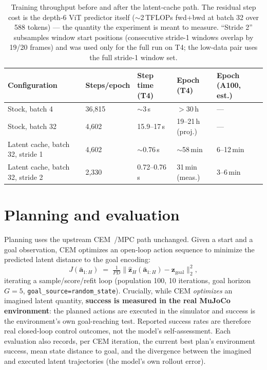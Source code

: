 \documentclass[11pt,a4paper]{article}
\newcommand{\zlat}{\mathbf{z}}
\newcommand{\abar}{\bar{\mathbf{a}}}
\begin{document}
\begin{table}[h]
\centering
\small
\begin{tabular}{lllll}
\toprule
Configuration & Steps/epoch & Step time (T4) & Epoch (T4) & Epoch (A100, est.) \\
\midrule
Stock, batch 4              & 36{,}815 & $\sim$3\,s    & $>$30\,h          & --- \\
Stock, batch 32             & 4{,}602  & 15.9--17\,s   & 19--21\,h (proj.) & --- \\
Latent cache, batch 32, stride 1 & 4{,}602 & $\sim$0.76\,s & $\sim$58\,min & 6--12\,min \\
Latent cache, batch 32, stride 2 & 2{,}330 & 0.72--0.76\,s & 31\,min (meas.) & 3--6\,min \\
\bottomrule
\end{tabular}
\caption{Training throughput before and after the latent-cache path. The
residual step cost is the depth-6 ViT predictor itself ($\sim$2\,TFLOPs
fwd+bwd at batch 32 over 588 tokens) --- the quantity the experiment is meant
to measure. ``Stride 2'' subsamples window start positions (consecutive
stride-1 windows overlap by 19/20 frames) and was used only for the full run
on T4; the low-data pair uses the full stride-1 window set.}
\label{tab:throughput}
\end{table}

\section{Planning and evaluation}
\label{sec:planning}

Planning uses the upstream CEM~\cite{cem}/MPC path unchanged. Given a start and
a goal observation, CEM optimizes an open-loop action sequence to minimize the
predicted latent distance to the goal encoding:
\begin{equation}
J(\abar_{1:H}) \;=\; \tfrac{1}{PD}\big\lVert \hat{\zlat}_H(\abar_{1:H}) - \zlat_{\mathrm{goal}} \big\rVert_2^2 ,
\label{eq:objective}
\end{equation}
iterating a sample/score/refit loop (population 100, 10 iterations, goal
horizon $G{=}5$, \texttt{goal\_source=random\_state}). Crucially, while CEM
\emph{optimizes} an imagined latent quantity, \textbf{success is measured in
the real MuJoCo environment}: the planned actions are executed in the
simulator and success is the environment's own goal-reaching test. Reported
success rates are therefore real closed-loop control outcomes, not the model's
self-assessment. Each evaluation also records, per CEM iteration, the current
best plan's environment success, mean state distance to goal, and the
divergence between the imagined and executed latent trajectories (the model's
own rollout error).
\end{document}
